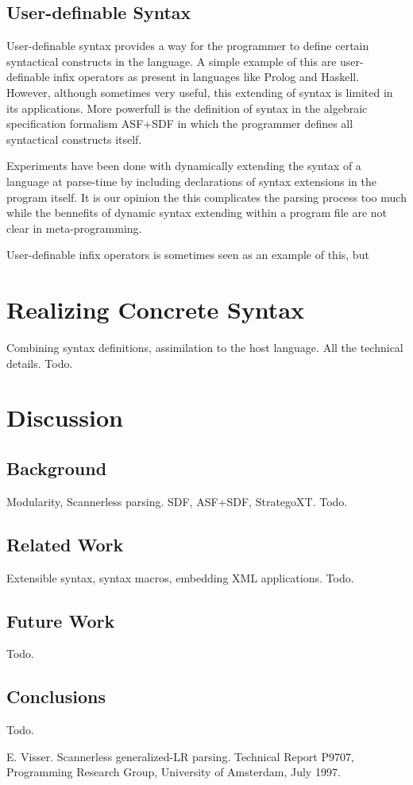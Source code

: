 \documentclass[a4paper,11pt]{article}
\begin{document}
\subsection{User-definable Syntax}

User-definable syntax provides a way for the programmer to define certain
syntactical constructs in the language. A simple example of this are
user-definable infix operators as present in languages like Prolog and
Haskell. However, although sometimes very useful, this extending of syntax
is limited in its applications. More powerfull is the definition of syntax
in the algebraic specification formalism ASF+SDF in which the programmer
defines all syntactical constructs itself.

Experiments have been done with dynamically extending the syntax of a
language at parse-time by including declarations of syntax extensions in
the program itself. It is our opinion the this complicates the parsing
process too much while the bennefits of dynamic syntax extending within
a program file are not clear in meta-programming.


User-definable infix operators is sometimes seen as an example of this, but




\section{Realizing Concrete Syntax}

Combining syntax definitions, assimilation to the host language.
All the technical details.
Todo.


\section{Discussion}


\subsection{Background}

Modularity, Scannerless parsing.
SDF, ASF+SDF, StrategoXT.
Todo.


\subsection{Related Work}

Extensible syntax, syntax macros, embedding XML applications.
Todo.


\subsection{Future Work}

Todo.


\subsection{Conclusions}

Todo.


\begin{thebibliography}{99}

E. Visser. Scannerless generalized-LR parsing.
Technical Report P9707, Programming Research Group, University of Amsterdam, July 1997.

\end{thebibliography}
\end{document}
